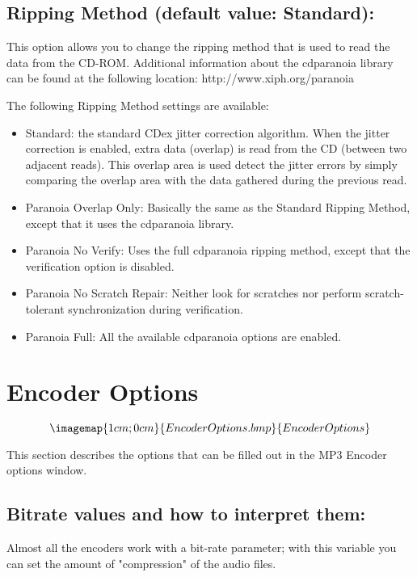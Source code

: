 \subsection{Ripping Method (default value: Standard):}
This option allows you to change the ripping method that is used to read
the data from the CD-ROM. Additional information about the cdparanoia library
can be found at the following location: http://www.xiph.org/paranoia

The following Ripping Method settings are available:

\begin{itemize}
\itemsep=0pt
\item Standard: the standard CDex jitter correction algorithm. When the jitter correction
is enabled, extra data (overlap) is read from the CD (between two adjacent reads). This
overlap area is used detect the jitter errors by simply comparing the overlap area with the
data gathered during the previous read.
\item Paranoia Overlap Only: Basically the same as the Standard Ripping Method, except that it
uses the cdparanoia library.
\item Paranoia No Verify: Uses the full cdparanoia ripping method, except that the verification option
is disabled.
\item Paranoia No Scratch Repair: Neither look for scratches nor perform scratch-tolerant 
synchronization during verification. 
\item Paranoia Full: All the available cdparanoia options are enabled. 
\end{itemize}
 

\section{Encoder Options}

$$\imagemap{1cm;0cm}{EncoderOptions.bmp}{EncoderOptions}$$

This section describes the options that can be filled out in the MP3 Encoder
options window.


\subsection{Bitrate values and how to interpret	them:}

Almost all the encoders work with a bit-rate parameter; with this variable you can
set the amount of "compression" of the audio files.


